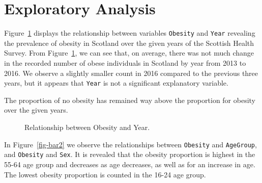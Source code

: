 \documentclass[
  letterpaper,
  DIV=11,
  numbers=noendperiod]{scrartcl}
\begin{document}
\section{Exploratory Analysis}\label{sec-exploranalysis}

Figure~\ref{fig-bar1} displays the relationship between variables
\texttt{Obesity} and \texttt{Year} revealing the prevalence of obesity
in Scotland over the given years of the Scottish Health Survey. From
Figure~\ref{fig-bar1}, we can see that, on average, there was not much
change in the recorded number of obese individuals in Scotland by year
from 2013 to 2016. We observe a slightly smaller count in 2016 compared
to the previous three years, but it appears that \texttt{Year} is not a
significant explanatory variable.

The proportion of no obesity has remained way above the proportion for
obesity over the given years.

\begin{figure}


\caption{\label{fig-bar1}Relationship between Obesity and Year.}

\end{figure}%

In Figure~\ref{fig-bar2} we observe the relationships between
\texttt{Obesity} and \texttt{AgeGroup}, and \texttt{Obesity} and
\texttt{Sex}. It is revealed that the obesity proportion is highest in
the 55-64 age group and decreases as age decreases, as well as for an
increase in age. The lowest obesity proportion is counted in the 16-24
age group.
\end{document}
